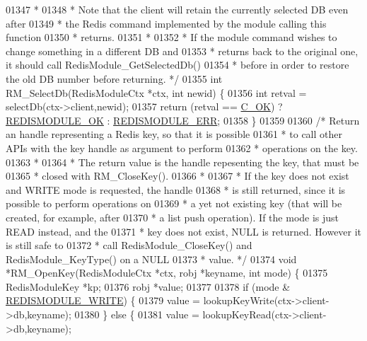 \begin{DoxyCode}
{{{01347 \textcolor{comment}{ *}
01348 \textcolor{comment}{ * Note that the client will retain the currently selected DB even after}
01349 \textcolor{comment}{ * the Redis command implemented by the module calling this function}
01350 \textcolor{comment}{ * returns.}
01351 \textcolor{comment}{ *}
01352 \textcolor{comment}{ * If the module command wishes to change something in a different DB and}
01353 \textcolor{comment}{ * returns back to the original one, it should call RedisModule\_GetSelectedDb()}
01354 \textcolor{comment}{ * before in order to restore the old DB number before returning. */}
01355 \textcolor{keywordtype}{int} RM\_SelectDb(RedisModuleCtx *ctx, \textcolor{keywordtype}{int} newid) \{
01356     \textcolor{keywordtype}{int} retval = selectDb(ctx->client,newid);
01357     \textcolor{keywordflow}{return} (retval == \hyperlink{server_8h_a303769ef1065076e68731584e758d3e1}{C\_OK}) ? \hyperlink{redismodule_8h_a1bc5bfd69abcd378ff52c640adc5418d}{REDISMODULE\_OK} : 
      \hyperlink{redismodule_8h_a3df6f5bd5247289e66f44437a7cddd49}{REDISMODULE\_ERR};
01358 \}
01359 
01360 \textcolor{comment}{/* Return an handle representing a Redis key, so that it is possible}
01361 \textcolor{comment}{ * to call other APIs with the key handle as argument to perform}
01362 \textcolor{comment}{ * operations on the key.}
01363 \textcolor{comment}{ *}
01364 \textcolor{comment}{ * The return value is the handle repesenting the key, that must be}
01365 \textcolor{comment}{ * closed with RM\_CloseKey().}
01366 \textcolor{comment}{ *}
01367 \textcolor{comment}{ * If the key does not exist and WRITE mode is requested, the handle}
01368 \textcolor{comment}{ * is still returned, since it is possible to perform operations on}
01369 \textcolor{comment}{ * a yet not existing key (that will be created, for example, after}
01370 \textcolor{comment}{ * a list push operation). If the mode is just READ instead, and the}
01371 \textcolor{comment}{ * key does not exist, NULL is returned. However it is still safe to}
01372 \textcolor{comment}{ * call RedisModule\_CloseKey() and RedisModule\_KeyType() on a NULL}
01373 \textcolor{comment}{ * value. */}
01374 \textcolor{keywordtype}{void} *RM\_OpenKey(RedisModuleCtx *ctx, robj *keyname, \textcolor{keywordtype}{int} mode) \{
01375     RedisModuleKey *kp;
01376     robj *value;
01377 
01378     \textcolor{keywordflow}{if} (mode & \hyperlink{redismodule_8h_a73b37117ef94cb4a904361afcc51b6b4}{REDISMODULE\_WRITE}) \{
01379         value = lookupKeyWrite(ctx->client->db,keyname);
01380     \} \textcolor{keywordflow}{else} \{
01381         value = lookupKeyRead(ctx->client->db,keyname);
}}}
\end{DoxyCode}
